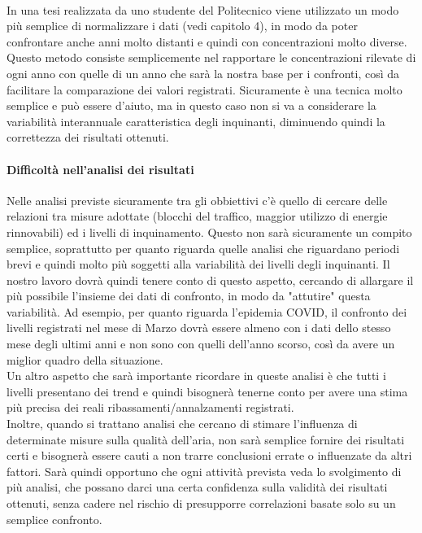 \documentclass{article}
\begin{document}
\\In una tesi realizzata da uno studente del Politecnico \cite{scolari2017evoluzione} viene utilizzato un modo più semplice di normalizzare i dati (vedi capitolo 4), in modo da poter confrontare anche anni molto distanti e quindi con concentrazioni molto diverse. Questo metodo consiste semplicemente nel rapportare le concentrazioni rilevate di ogni anno con quelle di un anno che sarà la nostra base per i confronti, così da facilitare la comparazione dei valori registrati. Sicuramente è una tecnica molto semplice e può essere d'aiuto, ma in questo caso non si va a considerare la variabilità interannuale caratteristica degli inquinanti, diminuendo quindi la correttezza dei risultati ottenuti.
\paragraph{Difficoltà nell'analisi dei risultati}
Nelle analisi previste sicuramente tra gli obbiettivi c'è quello di cercare delle relazioni tra misure adottate (blocchi del traffico, maggior utilizzo di energie rinnovabili) ed i livelli di inquinamento. Questo non sarà sicuramente un compito semplice, soprattutto per quanto riguarda quelle analisi che riguardano periodi brevi e quindi molto più soggetti alla variabilità dei livelli degli inquinanti. Il nostro lavoro dovrà quindi tenere conto di questo aspetto, cercando di allargare il più possibile l'insieme dei dati di confronto, in modo da "attutire" questa variabilità. Ad esempio, per quanto riguarda l'epidemia COVID, il confronto dei livelli registrati nel mese di Marzo dovrà essere almeno con i dati dello stesso mese degli ultimi anni e non sono con quelli dell'anno scorso, così da avere un miglior quadro della situazione.
\\Un altro aspetto che sarà importante ricordare in queste analisi è che tutti i livelli presentano dei trend e quindi bisognerà tenerne conto per avere una stima più precisa dei reali ribassamenti/annalzamenti registrati.
\\Inoltre, quando si trattano analisi che cercano di stimare l'influenza di determinate misure sulla qualità dell'aria, non sarà semplice fornire dei risultati certi e bisognerà essere cauti a non trarre conclusioni errate o influenzate da altri fattori. Sarà quindi opportuno che ogni attività prevista veda lo svolgimento di più analisi, che possano darci una certa confidenza sulla validità dei risultati ottenuti, senza cadere nel rischio di presupporre correlazioni basate solo su un semplice confronto.
\newpage



\end{document}
